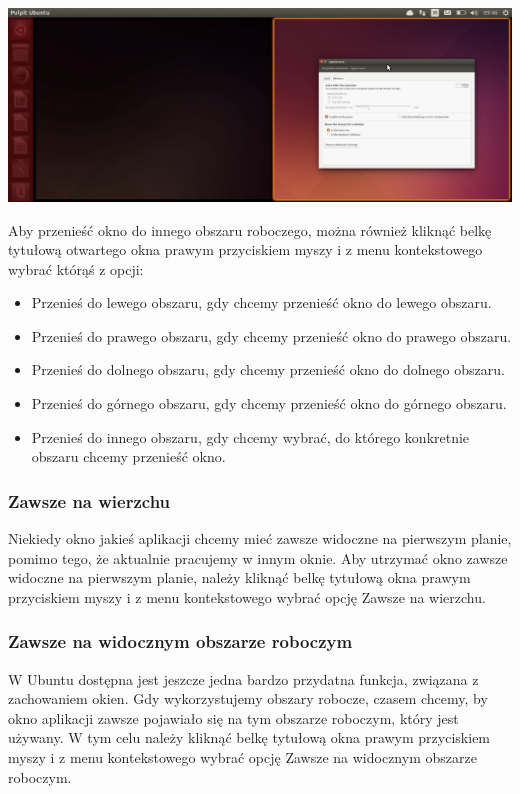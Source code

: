 \begin{center}
	\includegraphics[width=\linewidth]{images/unity_okno_przenoszenie3.png}
\end{center}

Aby przenieść okno do innego obszaru roboczego, można również kliknąć belkę tytułową otwartego okna prawym przyciskiem myszy i z menu kontekstowego wybrać którąś z opcji:
\begin{itemize}
\item \textcolor{ubuntu_orange}{Przenieś do lewego obszaru}, gdy chcemy przenieść okno do lewego obszaru.
\item \textcolor{ubuntu_orange}{Przenieś do prawego obszaru}, gdy chcemy przenieść okno do prawego obszaru.
\item \textcolor{ubuntu_orange}{Przenieś do dolnego obszaru}, gdy chcemy przenieść okno do dolnego obszaru.
\item \textcolor{ubuntu_orange}{Przenieś do górnego obszaru}, gdy chcemy przenieść okno do górnego obszaru.
\item \textcolor{ubuntu_orange}{Przenieś do innego obszaru}, gdy chcemy wybrać, do którego konkretnie obszaru chcemy przenieść okno.
\end{itemize}

\subsubsection{Zawsze na wierzchu}
Niekiedy okno jakieś aplikacji chcemy mieć zawsze widoczne na pierwszym planie, pomimo tego, że aktualnie pracujemy w innym oknie. Aby utrzymać okno zawsze widoczne na pierwszym planie, należy kliknąć belkę tytułową okna prawym przyciskiem myszy i z menu kontekstowego wybrać opcję \textcolor{ubuntu_orange}{Zawsze na wierzchu}.

\subsubsection{Zawsze na widocznym obszarze roboczym}
W Ubuntu dostępna jest jeszcze jedna bardzo przydatna funkcja, związana z zachowaniem okien. Gdy wykorzystujemy obszary robocze, czasem chcemy, by okno aplikacji zawsze pojawiało się na tym obszarze roboczym, który jest używany. W tym celu należy kliknąć belkę tytułową okna prawym przyciskiem myszy i z menu kontekstowego wybrać opcję \textcolor{ubuntu_orange}{Zawsze na widocznym obszarze roboczym}.
